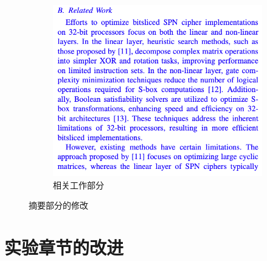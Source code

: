 \documentclass{beamer}
\begin{document}
\begin{frame}
\begin{figure}[h]
\begin{subfigure}[b]{0.3\textwidth}
        \includegraphics[width=\textwidth]{./fig/relatedWork.png}
        \caption{相关工作部分}
        \label{fig:related_work}
      \end{subfigure}
      \caption{摘要部分的修改}
      \label{fig:abstract_modifications}
    \end{figure}
\end{frame}

\section{实验章节的改进}
\end{document}
